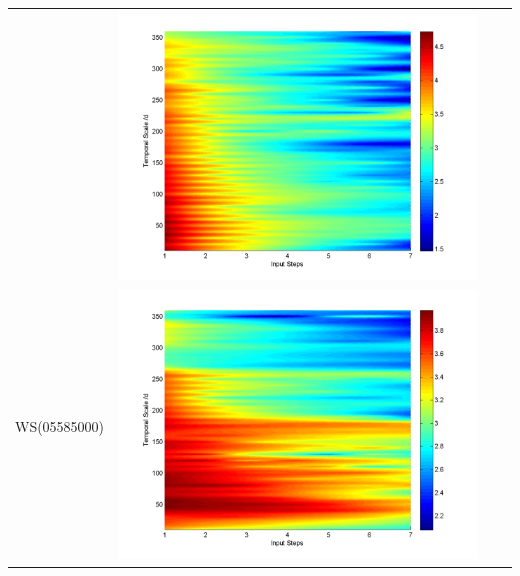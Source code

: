 \documentclass[11pt]{article}
\begin{document}
\begin{table}[H]
{\begin{tabular}{cccc}
&\begin{minipage}{.3\textwidth}\includegraphics[width=\linewidth]{resultgraph/AU/02143000pepq_rela.png}\end{minipage}
\\
WS(05585000)
&\begin{minipage}{.3\textwidth}\includegraphics[width=\linewidth]{resultgraph/AU/05585000p_rela.png}\end{minipage}

\end{tabular}}
\end{table}
\end{document}
